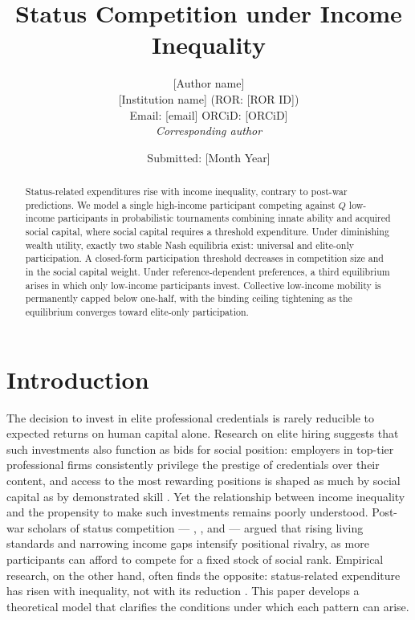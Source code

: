 \documentclass[
    oneside,
    fontsize=10pt,leqno]{article}
\begin{document}
\title{Status Competition under Income Inequality}
\author{[Author name]\\
  \small [Institution name] (ROR: [ROR ID])\\
  \small Email: [email] \quad ORCiD: [ORCiD]\\
  \small \textit{Corresponding author}}
\date{Submitted: [Month Year]}
\maketitle

\begin{abstract}
Status-related expenditures rise with income inequality, contrary to
post-war predictions. We model a single high-income participant
competing against $Q$ low-income participants in probabilistic
tournaments combining innate ability and acquired social capital,
where social capital requires a threshold expenditure. Under
diminishing wealth utility, exactly two stable Nash equilibria exist:
universal and elite-only participation. A closed-form participation
threshold decreases in competition size and in the social capital
weight. Under reference-dependent preferences, a third equilibrium
arises in which only low-income participants invest. Collective
low-income mobility is permanently capped below one-half, with the
binding ceiling tightening as the equilibrium converges toward
elite-only participation.


\end{abstract}

\section{Introduction}

\noindent

The decision to invest in elite professional credentials is rarely reducible to expected returns on human capital alone. Research on
elite hiring suggests that such investments also function as bids for
social position: employers in top-tier professional firms consistently
privilege the prestige of credentials over their content, and access
to the most rewarding positions is shaped as much by social capital
as by demonstrated skill \citep{Rivera2015Pedigree,Bills2003Credentials}.
Yet the relationship between income inequality and the propensity to
make such investments remains poorly understood. Post-war scholars
of status competition --- \citet{HirschSocialLimits},
\citet{GalbraithAffluent}, and \citet{FrankPond} --- argued that
rising living standards and narrowing income gaps intensify positional
rivalry, as more participants can afford to compete for a fixed stock
of social rank. Empirical research, on the other hand, often finds the
opposite: status-related expenditure has risen with inequality, not with
its reduction \citep{JinLiWu2011,JaikumarSarin2015,ChaiKausKiedaisch2019}.
This paper develops a theoretical model that clarifies the conditions
under which each pattern can arise.
\end{document}
